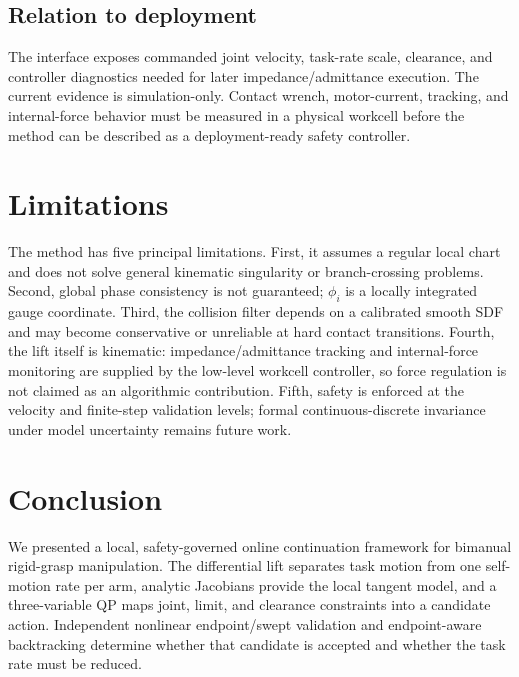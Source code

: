 \documentclass[preprint,12pt]{elsarticle}
\begin{document}
\subsection{Relation to deployment}

The interface exposes commanded joint velocity, task-rate scale, clearance, and controller diagnostics needed for later impedance/admittance execution. The current evidence is simulation-only. Contact wrench, motor-current, tracking, and internal-force behavior must be measured in a physical workcell before the method can be described as a deployment-ready safety controller.

\section{Limitations}
\label{sec:limitations}

The method has five principal limitations. First, it assumes a regular local chart and does not solve general kinematic singularity or branch-crossing problems. Second, global phase consistency is not guaranteed; $\phi_i$ is a locally integrated gauge coordinate. Third, the collision filter depends on a calibrated smooth SDF and may become conservative or unreliable at hard contact transitions. Fourth, the lift itself is kinematic: impedance/admittance tracking and internal-force monitoring are supplied by the low-level workcell controller, so force regulation is not claimed as an algorithmic contribution. Fifth, safety is enforced at the velocity and finite-step validation levels; formal continuous-discrete invariance under model uncertainty remains future work.

\section{Conclusion}
\label{sec:conclusion}

We presented a local, safety-governed online continuation framework for bimanual rigid-grasp manipulation. The differential lift separates task motion from one self-motion rate per arm, analytic Jacobians provide the local tangent model, and a three-variable QP maps joint, limit, and clearance constraints into a candidate action. Independent nonlinear endpoint/swept validation and endpoint-aware backtracking determine whether that candidate is accepted and whether the task rate must be reduced.
\end{document}
